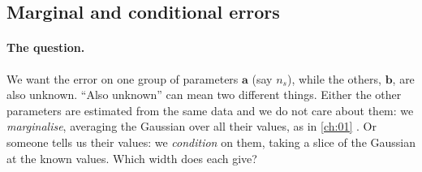 \subsection{Marginal and conditional errors}
\label{10a:sec:marginal}

\paragraph{The question.} We want the error on one group of parameters $\bm a$ (say $n_s$), while the others,
$\bm b$, are also unknown. ``Also unknown'' can mean two different things. Either the other parameters are
estimated from the same data and we do not care about them: we \emph{marginalise}, averaging the Gaussian over
all their values, as in \cref{ch:01} . Or someone tells us their values: we \emph{condition} on them, taking a
slice of the Gaussian at the known values. Which width does each give?

